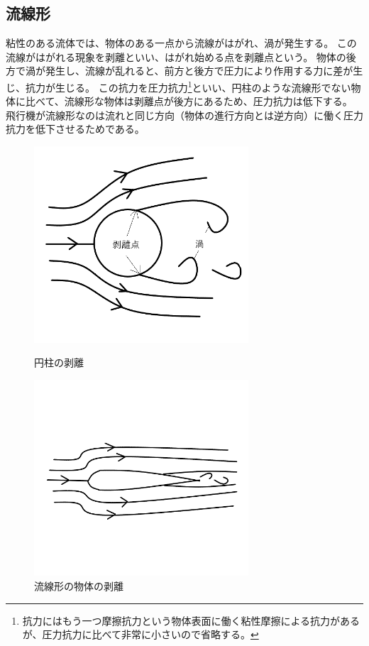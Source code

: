 \documentclass[10pt,b5paper,papersize,dvipdfmx]{jsbook}
\begin{document}
\subsection{流線形}
粘性のある流体では、物体のある一点から流線がはがれ、渦が発生する。
この流線がはがれる現象を剥離といい、はがれ始める点を剥離点という。
物体の後方で渦が発生し、流線が乱れると、前方と後方で圧力により作用する力に差が生じ、抗力が生じる。
この抗力を圧力抗力\footnote{抗力にはもう一つ摩擦抗力という物体表面に働く粘性摩擦による抗力があるが、圧力抗力に比べて非常に小さいので省略する。}といい、円柱のような流線形でない物体に比べて、流線形な物体は剥離点が後方にあるため、圧力抗力は低下する。
飛行機が流線形なのは流れと同じ方向（物体の進行方向とは逆方向）に働く圧力抗力を低下させるためである。
\begin{figure}[ht]
  \centering
  \includegraphics[width=80mm]{img/ryuutai5.png}
  \caption{円柱の剥離}
  \centering
  \includegraphics[width=80mm]{img/ryuutai6.png}
  \caption{流線形の物体の剥離}
\end{figure}
\end{document}
